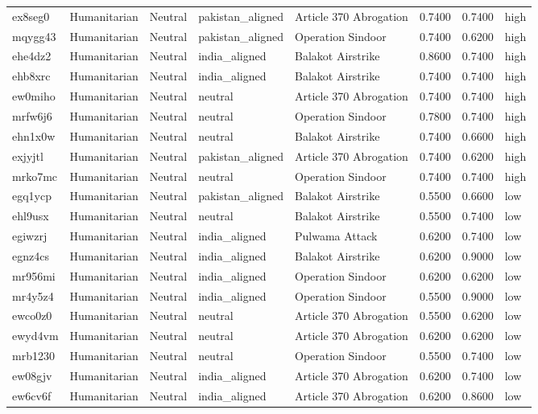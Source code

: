 \begin{longtable}{lllllrrl}
ex8seg0 & Humanitarian & Neutral & pakistan\_aligned & Article 370 Abrogation & 0.7400 & 0.7400 & high \\
mqygg43 & Humanitarian & Neutral & pakistan\_aligned & Operation Sindoor & 0.7400 & 0.6200 & high \\
ehe4dz2 & Humanitarian & Neutral & india\_aligned & Balakot Airstrike & 0.8600 & 0.7400 & high \\
ehb8xrc & Humanitarian & Neutral & india\_aligned & Balakot Airstrike & 0.7400 & 0.7400 & high \\
ew0miho & Humanitarian & Neutral & neutral & Article 370 Abrogation & 0.7400 & 0.7400 & high \\
mrfw6j6 & Humanitarian & Neutral & neutral & Operation Sindoor & 0.7800 & 0.7400 & high \\
ehn1x0w & Humanitarian & Neutral & neutral & Balakot Airstrike & 0.7400 & 0.6600 & high \\
exjyjtl & Humanitarian & Neutral & pakistan\_aligned & Article 370 Abrogation & 0.7400 & 0.6200 & high \\
mrko7mc & Humanitarian & Neutral & neutral & Operation Sindoor & 0.7400 & 0.7400 & high \\
egq1ycp & Humanitarian & Neutral & pakistan\_aligned & Balakot Airstrike & 0.5500 & 0.6600 & low \\
ehl9usx & Humanitarian & Neutral & neutral & Balakot Airstrike & 0.5500 & 0.7400 & low \\
egiwzrj & Humanitarian & Neutral & india\_aligned & Pulwama Attack & 0.6200 & 0.7400 & low \\
egnz4cs & Humanitarian & Neutral & india\_aligned & Balakot Airstrike & 0.6200 & 0.9000 & low \\
mr956mi & Humanitarian & Neutral & india\_aligned & Operation Sindoor & 0.6200 & 0.6200 & low \\
mr4y5z4 & Humanitarian & Neutral & india\_aligned & Operation Sindoor & 0.5500 & 0.9000 & low \\
ewco0z0 & Humanitarian & Neutral & neutral & Article 370 Abrogation & 0.5500 & 0.6200 & low \\
ewyd4vm & Humanitarian & Neutral & neutral & Article 370 Abrogation & 0.6200 & 0.6200 & low \\
mrb1230 & Humanitarian & Neutral & neutral & Operation Sindoor & 0.5500 & 0.7400 & low \\
ew08gjv & Humanitarian & Neutral & india\_aligned & Article 370 Abrogation & 0.6200 & 0.7400 & low \\
ew6cv6f & Humanitarian & Neutral & india\_aligned & Article 370 Abrogation & 0.6200 & 0.8600 & low \\

\end{longtable}
